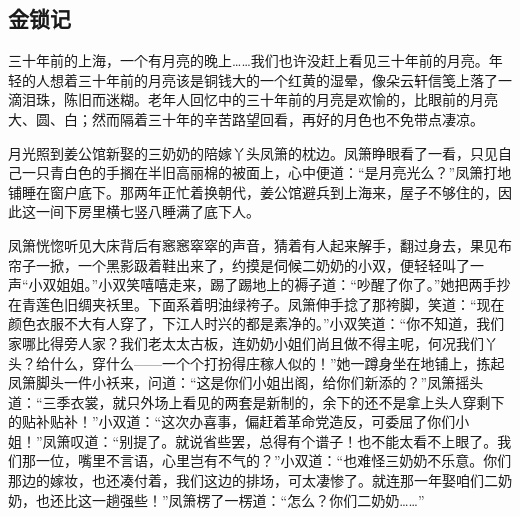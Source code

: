 \subsection{金锁记}


\par 三十年前的上海，一个有月亮的晚上……我们也许没赶上看见三十年前的月亮。年轻的人想着三十年前的月亮该是铜钱大的一个红黄的湿晕，像朵云轩信笺上落了一滴泪珠，陈旧而迷糊。老年人回忆中的三十年前的月亮是欢愉的，比眼前的月亮大、圆、白；然而隔着三十年的辛苦路望回看，再好的月色也不免带点凄凉。
\par 月光照到姜公馆新娶的三奶奶的陪嫁丫头凤箫的枕边。凤箫睁眼看了一看，只见自己一只青白色的手搁在半旧高丽棉的被面上，心中便道：“是月亮光么？”凤箫打地铺睡在窗户底下。那两年正忙着换朝代，姜公馆避兵到上海来，屋子不够住的，因此这一间下房里横七竖八睡满了底下人。
\par 凤箫恍惚听见大床背后有窸窸窣窣的声音，猜着有人起来解手，翻过身去，果见布帘子一掀，一个黑影趿着鞋出来了，约摸是伺候二奶奶的小双，便轻轻叫了一声“小双姐姐。”小双笑嘻嘻走来，踢了踢地上的褥子道：“吵醒了你了。”她把两手抄在青莲色旧绸夹袄里。下面系着明油绿袴子。凤箫伸手捻了那袴脚，笑道：“现在颜色衣服不大有人穿了，下江人时兴的都是素净的。”小双笑道：“你不知道，我们家哪比得旁人家？我们老太太古板，连奶奶小姐们尚且做不得主呢，何况我们丫头？给什么，穿什么——一个个打扮得庄稼人似的！”她一蹲身坐在地铺上，拣起凤箫脚头一件小袄来，问道：“这是你们小姐出阁，给你们新添的？”凤箫摇头道：“三季衣裳，就只外场上看见的两套是新制的，余下的还不是拿上头人穿剩下的贴补贴补！”小双道：“这次办喜事，偏赶着革命党造反，可委屈了你们小姐！”凤箫叹道：“别提了。就说省些罢，总得有个谱子！也不能太看不上眼了。我们那一位，嘴里不言语，心里岂有不气的？”小双道：“也难怪三奶奶不乐意。你们那边的嫁妆，也还凑付着，我们这边的排场，可太凄惨了。就连那一年娶咱们二奶奶，也还比这一趟强些！”凤箫楞了一楞道：“怎么？你们二奶奶……”
